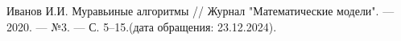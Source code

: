 \begin{thebibliography}{}
	 Иванов И.И. Муравьиные алгоритмы // Журнал "Математические модели". — 2020. — №3. — С. 5–15.(дата обращения: 23.12.2024).
\end{thebibliography}

